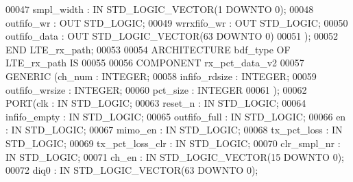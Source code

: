 \begin{DoxyCode}
00047         \textcolor{vhdlchar}{smpl_width} \textcolor{vhdlchar}{:}  \textcolor{keywordflow}{IN}  \textcolor{comment}{STD\_LOGIC\_VECTOR}\textcolor{vhdlchar}{(}\textcolor{vhdllogic}{}\textcolor{vhdllogic}{1} \textcolor{keywordflow}{DOWNTO} \textcolor{vhdllogic}{}\textcolor{vhdllogic}{0}\textcolor{vhdlchar}{)};
00048         \textcolor{vhdlchar}{outfifo_wr} \textcolor{vhdlchar}{:}  \textcolor{keywordflow}{OUT}  \textcolor{comment}{STD\_LOGIC};
00049         \textcolor{vhdlchar}{wrrxfifo_wr} \textcolor{vhdlchar}{:}  \textcolor{keywordflow}{OUT}  \textcolor{comment}{STD\_LOGIC};
00050         \textcolor{vhdlchar}{outfifo_data} \textcolor{vhdlchar}{:}  \textcolor{keywordflow}{OUT}  \textcolor{comment}{STD\_LOGIC\_VECTOR}\textcolor{vhdlchar}{(}\textcolor{vhdllogic}{}\textcolor{vhdllogic}{63} \textcolor{keywordflow}{DOWNTO} \textcolor{vhdllogic}{}\textcolor{vhdllogic}{0}\textcolor{vhdlchar}{)}
00051     \textcolor{vhdlchar}{)};
00052 \textcolor{keywordflow}{END} \textcolor{vhdlchar}{LTE\_rx\_path};
00053 
00054 \textcolor{keywordflow}{ARCHITECTURE} bdf\_type \textcolor{keywordflow}{OF} LTE_rx_path IS 
00055 
00056 \textcolor{keywordflow}{COMPONENT} rx_pct_data_v2
00057 \textcolor{keywordflow}{GENERIC} (ch_num : \textcolor{comment}{INTEGER};
00058             infifo_rdsize : \textcolor{comment}{INTEGER};
00059             outfifo_wrsize : \textcolor{comment}{INTEGER};
00060             pct_size : \textcolor{comment}{INTEGER}
00061             );
00062     \textcolor{keywordflow}{PORT}(clk : \textcolor{keywordflow}{IN} \textcolor{comment}{STD\_LOGIC};
00063          reset_n : \textcolor{keywordflow}{IN} \textcolor{comment}{STD\_LOGIC};
00064          infifo_empty : \textcolor{keywordflow}{IN} \textcolor{comment}{STD\_LOGIC};
00065          outfifo_full : \textcolor{keywordflow}{IN} \textcolor{comment}{STD\_LOGIC};
00066          en : \textcolor{keywordflow}{IN} \textcolor{comment}{STD\_LOGIC};
00067          mimo_en : \textcolor{keywordflow}{IN} \textcolor{comment}{STD\_LOGIC};
00068          tx_pct_loss : \textcolor{keywordflow}{IN} \textcolor{comment}{STD\_LOGIC};
00069          tx_pct_loss_clr : \textcolor{keywordflow}{IN} \textcolor{comment}{STD\_LOGIC};
00070          clr_smpl_nr : \textcolor{keywordflow}{IN} \textcolor{comment}{STD\_LOGIC};
00071          ch_en : \textcolor{keywordflow}{IN} \textcolor{comment}{STD\_LOGIC\_VECTOR}(\textcolor{vhdllogic}{}\textcolor{vhdllogic}{15} \textcolor{keywordflow}{DOWNTO} \textcolor{vhdllogic}{}\textcolor{vhdllogic}{0});
00072          diq0 : \textcolor{keywordflow}{IN} \textcolor{comment}{STD\_LOGIC\_VECTOR}(\textcolor{vhdllogic}{}\textcolor{vhdllogic}{63} \textcolor{keywordflow}{DOWNTO} \textcolor{vhdllogic}{}\textcolor{vhdllogic}{0});

\end{DoxyCode}
